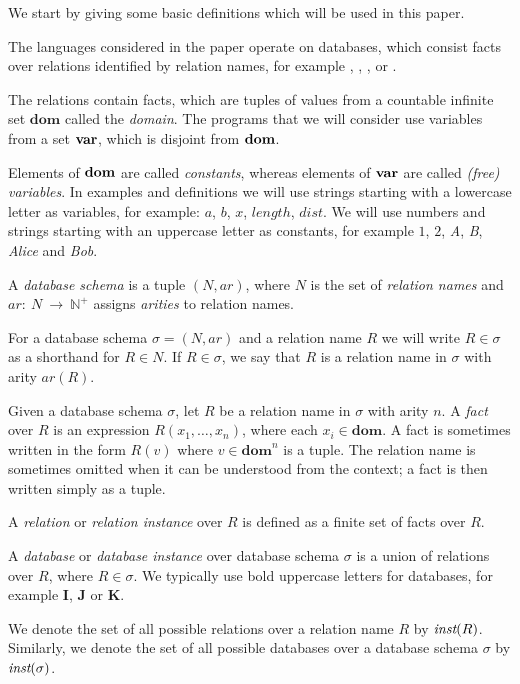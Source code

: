 We start by giving some basic definitions which will be used in this paper.

The languages considered in the paper operate on databases, which consist facts over relations identified by relation names, for example , , ,  or .

The relations contain facts, which are tuples of values from a countable infinite set $\textbf{dom}$ called the \emph{domain}. The programs that we will consider use variables from a set $\bf{var}$, which is disjoint from $\bf{dom}$. 

Elements of $\bf{dom}$ are called \emph{constants}, whereas elements of $\bf{var}$ are called \emph{(free) variables}.
In examples and definitions we will use strings starting with a lowercase letter as variables, for example: $a$, $b$, $x$, $length$, $dist$. We will use numbers and strings starting with an uppercase letter as constants, for example $1$, $2$, \textit{A}, \textit{B}, \textit{Alice} and \textit{Bob}.

\begin{defn}

A \emph{database schema} is a tuple $(N, ar)$, where $N$ is the set of \emph{relation names} and $ar:~N~\to~\mathbb{N}^+$ assigns \emph{arities} to relation names. 

For a database schema $\sigma = (N, ar)$ and a relation name $R$ we will write $R \in \sigma$ as a shorthand for $R \in N$. If $R \in \sigma$, we say that $R$ is a relation name in $\sigma$ with arity $ar(R)$.

Given a database schema $\sigma$, let $R$ be a relation name in $\sigma$ with arity $n$. A \emph{fact} over $R$ is an expression $R(x_1 , \dots , x_n)$, where each $x_i \in \textbf{dom}$. A fact is sometimes written in the form $R(v)$ where $v \in \textbf{dom}^n$ is a tuple. The relation name is sometimes omitted when it can be understood from the context; a fact is then written simply as a tuple.

A \emph{relation} or \emph{relation instance} over $R$ is defined as a finite set of facts over $R$.

A \emph{database} or \emph{database instance} over database schema $\sigma$ is a union of relations over $R$, where $R \in \sigma$. We typically use bold uppercase letters for databases, for example $\textbf{I}$, $\textbf{J}$ or $\textbf{K}$. 

We denote the set of all possible relations over a relation name $R$ by $\textit{inst}(R)$. Similarly, we denote the set of all possible databases over a database schema $\sigma$ by $\textit{inst}(\sigma)$.
\end{defn}


